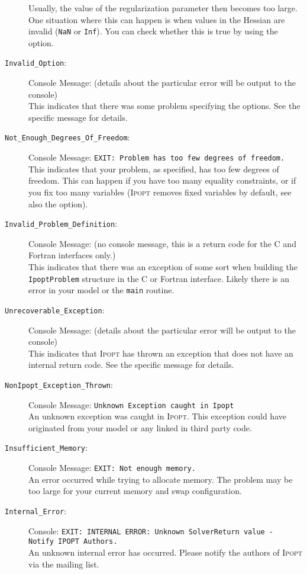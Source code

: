 \documentclass[10pt]{article}
\newcommand{\Ipopt}{\textsc{Ipopt}\xspace}
\begin{document}
\begin{description}
  Usually, the value of the regularization parameter then becomes too
  large.  One situation where this can happen is when values in the
  Hessian are invalid ({\tt NaN} or {\tt Inf}).  You can check whether this
  is true by using the
   option.
\item[{\tt Invalid\_Option}:]  $\;$ \\
  Console Message: (details about the particular error
  will be output to the console) \\
  This indicates that there was some problem specifying the options.
  See the specific message for details.
\item[{\tt Not\_Enough\_Degrees\_Of\_Freedom}:]  $\;$ \\
  Console Message: {\tt EXIT: Problem has too few degrees of freedom.} \\
  This indicates that your problem, as specified, has too few degrees
  of freedom. This can happen if you have too many equality
  constraints, or if you fix too many variables (\Ipopt removes fixed
  variables by default, see also the  option).
\item[{\tt Invalid\_Problem\_Definition}:]  $\;$ \\
  Console Message: (no console message, this is a return code for the
  C and Fortran interfaces only.) \\
  This indicates that there was an exception of some sort when
  building the {\tt IpoptProblem} structure in the C or Fortran
  interface. Likely there is an error in your model or the {\tt main}
  routine.
\item[{\tt Unrecoverable\_Exception}:]  $\;$ \\
  Console Message: (details about the particular error
  will be output to the console) \\
  This indicates that \Ipopt has thrown an exception that does not
  have an internal return code. See the specific message for details.
\item[{\tt NonIpopt\_Exception\_Thrown}:]  $\;$ \\
  Console Message: {\tt Unknown Exception caught in Ipopt} \\
  An unknown exception was caught in \Ipopt. This exception could have
  originated from your model or any linked in third party code.
\item[{\tt Insufficient\_Memory}:]  $\;$ \\
  Console Message: {\tt EXIT: Not enough memory.} \\
  An error occurred while trying to allocate memory. The problem may
  be too large for your current memory and swap configuration.
\item[{\tt Internal\_Error}:]  $\;$ \\
  Console: {\tt EXIT: INTERNAL ERROR: Unknown SolverReturn
    value - Notify IPOPT Authors.} \\
  An unknown internal error has occurred. Please notify the authors of
  \Ipopt via the mailing list.

\end{description}
\end{document}
